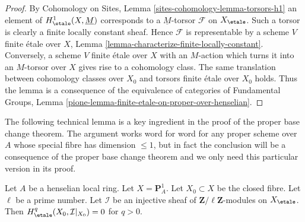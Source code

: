 \begin{proof}
By Cohomology on Sites, Lemma \ref{sites-cohomology-lemma-torsors-h1}
an element of $H^1_\etale(X, \underline{M})$ corresponds to a
$\underline{M}$-torsor $\mathcal{F}$ on $X_\etale$.
Such a torsor is clearly a finite locally constant sheaf.
Hence $\mathcal{F}$ is representable by a scheme $V$ finite
\'etale over $X$, Lemma \ref{lemma-characterize-finite-locally-constant}.
Conversely, a scheme $V$ finite \'etale over $X$ with an $M$-action
which turns it into an $M$-torsor over $X$ gives rise to a cohomology
class. The same translation between cohomology classes over $X_0$ and
torsors finite \'etale over $X_0$ holds. Thus the lemma
is a consequence of the equivalence of categories of
Fundamental Groups, Lemma
\ref{pione-lemma-finite-etale-on-proper-over-henselian}.
\end{proof}

\noindent
The following technical lemma is a key ingredient in the proof of
the proper base change theorem. The argument works word for word
for any proper scheme over $A$ whose special fibre has dimension
$\leq 1$, but in fact the conclusion will be a consequence of the
proper base change theorem and we only need this particular version
in its proof.

\begin{lemma}
\label{lemma-efface-cohomology-on-fibre-by-finite-cover}
Let $A$ be a henselian local ring. Let $X = \mathbf{P}^1_A$.
Let $X_0 \subset X$ be the closed fibre. Let $\ell$ be a prime
number. Let $\mathcal{I}$ be an injective sheaf of
$\mathbf{Z}/\ell\mathbf{Z}$-modules on $X_\etale$. Then
$H^q_\etale(X_0, \mathcal{I}|_{X_0}) = 0$ for $q > 0$.
\end{lemma}

